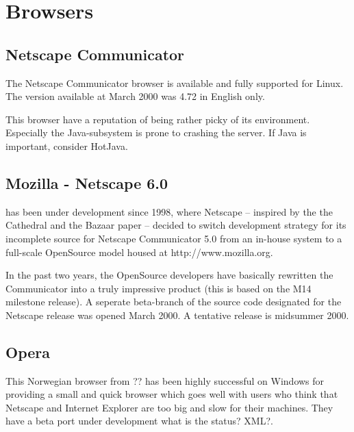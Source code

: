 \section{Browsers}


\subsection{Netscape Communicator}
\label{sec:netscape-communicator}

The Netscape Communicator browser is available and fully supported for
Linux.  The version available at March 2000 was 4.72 in English only.

This browser have a reputation of being rather picky of its
environment.  Especially the Java-subsystem is prone to crashing the
server.  If Java is important, consider HotJava.


\subsection{Mozilla - Netscape 6.0}
\label{sec:mozilla}

 has been under
development since 1998, where Netscape -- inspired by the \textsf{the
Cathedral and the Bazaar} paper -- decided to switch development
strategy for its incomplete source for Netscape Communicator 5.0 from
an in-house system to a full-scale OpenSource model housed at
http://www.mozilla.org.

In the past two years, the OpenSource developers have basically
rewritten the Communicator into a truly impressive product (this is
based on the M14 milestone release).  A seperate beta-branch of the
source code designated for the Netscape release was opened March
2000. A tentative release is midsummer 2000.


\subsection{Opera}
\label{sec:opera}

This Norwegian browser from \textsf{??} has been highly successful on
Windows for providing a small and quick browser which goes well with
users who think that Netscape and Internet Explorer are too big and
slow for their machines. They have \textsf{a beta port under
development what is the status?  XML?}.


